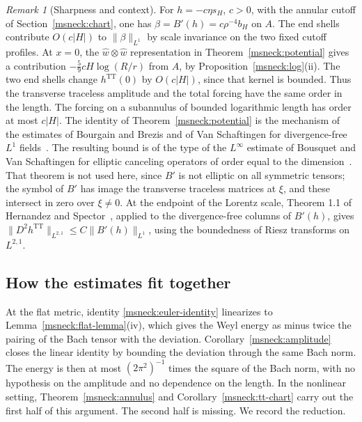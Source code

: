 \documentclass[11pt]{article}
\numberwithin{equation}{section}
\theoremstyle{definition}
\theoremstyle{remark}
\newtheorem{remark}[theorem]{Remark}
\begin{document}
\begin{remark}[Sharpness and context]\label{msneck:linear-remark}
For \(h=-c\eta s_H\), \(c>0\), with the annular cutoff of
Section~\ref{msneck:chart}, one has \(\beta=B'(h)=c\rho^{-4}b_H\) on \(A\).
The end shells contribute \(O(c|H|)\) to \(\|\beta\|_{L^1}\) by
scale invariance on the two fixed cutoff profiles. At \(x=0\), the
\(\hat w\otimes\hat w\) representation in Theorem~\ref{msneck:potential}
gives a contribution
\(-\tfrac59cH\log(R/r)\) from \(A\), by
Proposition~\ref{msneck:log}(ii). The two end shells change
\(h^{\mathrm{TT}}(0)\) by \(O(c|H|)\), since that kernel is bounded.
Thus the transverse traceless amplitude and the total forcing have
the same order in the length. The forcing on a subannulus of bounded
logarithmic length has order at most \(c|H|\). The identity of
Theorem~\ref{msneck:potential} is the mechanism
of the estimates of Bourgain and Brezis and of Van Schaftingen for
divergence-free \(L^1\) fields~\cite{BourgainBrezis2004NewEstimates,
VanSchaftingen2004L1Vector,VanSchaftingen2013Canceling}. The resulting
bound is of the type of the \(L^\infty\) estimate of Bousquet and Van
Schaftingen for elliptic canceling operators of order equal to the
dimension~\cite[Theorem 3]{BousquetVanSchaftingen2014Hardy}. That theorem
is not used here, since \(B'\) is not elliptic on all symmetric tensors;
the symbol of \(B'\) has image the transverse traceless matrices at
\(\xi\), and these intersect in zero over \(\xi\ne0\). At the endpoint of
the Lorentz scale, Theorem 1.1 of Hernandez and
Spector~\cite{HernandezSpector2024Fractional}, applied to the
divergence-free columns of \(B'(h)\), gives
\(\|D^2h^{\mathrm{TT}}\|_{L^{2,1}}\le C\|B'(h)\|_{L^1}\), using the boundedness
of Riesz transforms on \(L^{2,1}\).
\end{remark}

\subsection{How the estimates fit together}
\label{msneck:synthesis}

At the flat metric, identity \eqref{msneck:euler-identity} linearizes to
Lemma~\ref{msneck:flat-lemma}(iv), which gives the Weyl energy as minus
twice the pairing of the Bach tensor with the deviation.
Corollary~\ref{msneck:amplitude}
closes the linear identity by bounding the deviation through the same
Bach norm. The energy is then at most \((2\pi^2)^{-1}\) times the square of
the Bach norm, with no hypothesis on the amplitude and no dependence on
the length. In the nonlinear setting, Theorem~\ref{msneck:annulus} and
Corollary~\ref{msneck:tt-chart} carry out the first half of this
argument. The second half is missing. We record the reduction.
\end{document}
